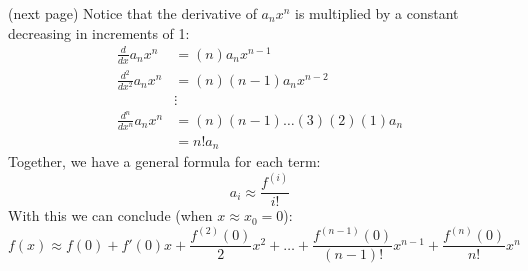 \documentclass{report}
\begin{document}
(next page)
\newpage
\noindent Notice that the derivative of $a_nx^n$ is multiplied by a constant decreasing in increments of 1:
\begin{align*}
\frac{d}{dx}a_nx^n&=(n)a_nx^{n-1}\\
\frac{d^2}{dx^2}a_nx^n&=(n)(n-1)a_nx^{n-2}\\
&\vdots\\
\frac{d^n}{dx^n}a_nx^n&=(n)(n-1)\ldots(3)(2)(1)a_n\\
&=n!a_n
\end{align*}
Together, we have a general formula for each term:
\begin{equation*}
a_i\approx \frac{f^{(i)}}{i!}
\end{equation*}
With this we can conclude (when $x\approx x_0=0$):
\begin{equation*}
f(x)\approx f(0)+f'(0)x+\frac{f^{(2)}(0)}{2}x^2+\ldots
+\frac{f^{(n-1)}(0)}{(n-1)!}x^{n-1}
+\frac{f^{(n)}(0)}{n!}x^n
\end{equation*}
\newpage
\end{document}
